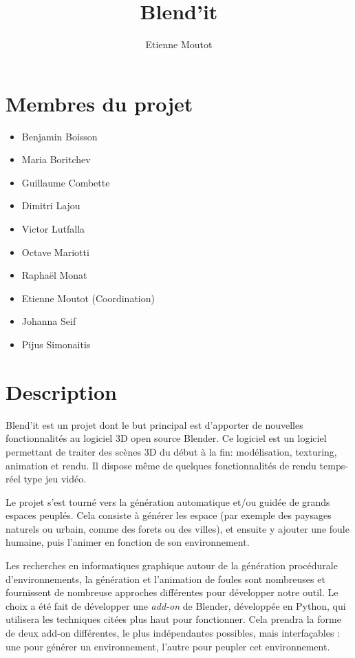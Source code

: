 \documentclass[a4paper,12pt]{article}
\title{Blend'it}
\author{Etienne Moutot}
\begin{document}
\maketitle

\section{Membres du projet}
  \begin{itemize}
    \item Benjamin Boisson
    \item Maria Boritchev
    \item Guillaume Combette
    \item Dimitri Lajou
    \item Victor Lutfalla
    \item Octave Mariotti
    \item Raphaël Monat
    \item Etienne Moutot (Coordination)
    \item Johanna Seif
    \item Pijus Simonaitis
  \end{itemize}

\section{Description}
Blend'it est un projet dont le but principal est d'apporter de nouvelles fonctionnalités au logiciel 3D open source Blender\cite{Blender}. Ce logiciel est un logiciel permettant de traiter des scènes 3D du début à la fin: modélisation, texturing, animation et rendu. Il dispose même de quelques fonctionnalités de rendu temps-réel type jeu vidéo.

Le projet s'est tourné vers la génération automatique et/ou guidée de grands espaces peuplés. Cela consiste à générer les espace (par exemple des paysages naturels ou urbain, comme des forets ou des villes), et ensuite y ajouter une foule humaine, puis l'animer en fonction de son environnement.

Les recherches en informatiques graphique autour de la génération procédurale d'environnements, la génération et  l'animation de foules sont nombreuses et fournissent de nombreuse approches différentes pour développer notre outil. Le choix a été fait de développer une \textit{add-on} de Blender, développée en Python, qui utilisera les techniques citées plus haut pour fonctionner. Cela prendra la forme de deux add-on différentes, le plus indépendantes possibles, mais interfaçables : une pour générer un environnement, l'autre pour peupler cet environnement.
\end{document}
